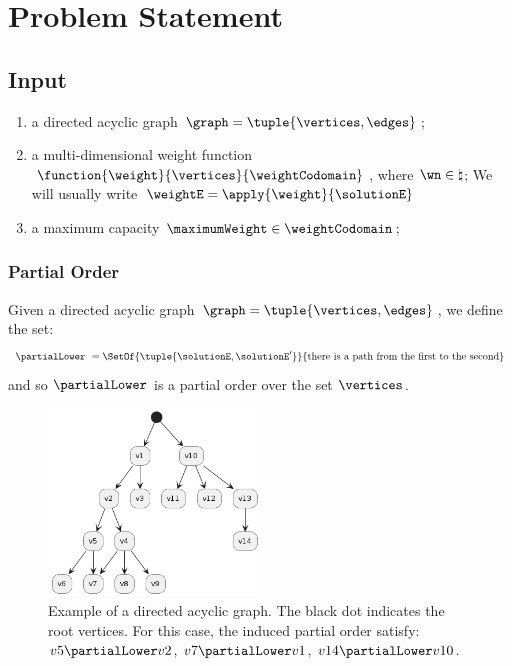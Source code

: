 \section{Problem Statement}

\subsection{Input}

\begin{enumerate}
    \item a directed acyclic graph $\graph = \tuple{\vertices,\edges}$;
    \item a multi-dimensional weight function $\function{\weight}{\vertices}{\weightCodomain}$, where $\wn \in \natural$;
        \subitem We will usually write $\weightE = \apply{\weight}{\solutionE}$
    \item a maximum capacity $\maximumWeight \in \weightCodomain$;
\end{enumerate}

\subsubsection{Partial Order}

\begin{defn}
    Given a directed acyclic graph $\graph = \tuple{\vertices,\edges}$, we define the set:
    \begin{equation}
        \partialLower
        \ =
        \SetOf
            {\tuple{\solutionE, \solutionE'}}
            {\mbox{there is a path from the first to the second}}
    \end{equation}
    and so $\partialLower$ is a partial order over the set $\vertices$.
\end{defn}

\begin{figure}[ht!]
    \centering
    \includegraphics[width=0.5\textwidth]{images/directed acyclic graph.png}
    \caption{Example of a directed acyclic graph. The black dot indicates the root vertices. For this case, the induced partial order satisfy: $v5 \partialLower v2$, $v7 \partialLower v1$, $v14 \partialLower v10$.}
\end{figure}

